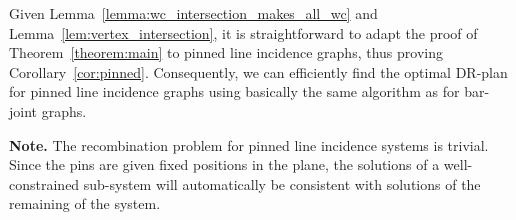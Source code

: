 Given Lemma~\ref{lemma:wc_intersection_makes_all_wc} and Lemma~\ref{lem:vertex_intersection},
it is straightforward to adapt the proof of Theorem~\ref{theorem:main}
to  pinned line incidence graphs,
thus proving Corollary~\ref{cor:pinned}.
Consequently, we can efficiently find the optimal DR-plan for  pinned line incidence graphs using basically the same algorithm as for  bar-joint graphs.

{\bf Note. }The recombination problem for  pinned line incidence systems is trivial.
Since the pins are given fixed positions in the plane,
 the solutions of a well-constrained sub-system will automatically be consistent with solutions of the remaining of the system.


